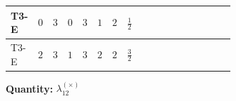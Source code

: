 \documentclass[8pt]{article}
\begin{document}
\begin{landscape}
\begin{longtable}{@{}llcccccc >{\raggedright\arraybackslash}p{0.21\linewidth} >{\raggedright\arraybackslash}p{0.21\linewidth} >{\raggedright\arraybackslash}p{0.21\linewidth}@{}}
\midrule
T3-E & $0$ & $3$ & $0$ & $3$ & $1$ & $2$ & $\frac{1}{2}$ & \scriptsize\adjustbox{max width=\linewidth}{$\begin{gathered} {\lambda_{12}^{(1)}} \left(\frac{1}{2} T_{\nu}^{(1)}+\frac{1}{2} T_{\nu}^{(2)}+8 {\lambda_{12}^{(\times)}}+{\lambda_{S_1}^{(A)}}+{\lambda_{S_2}^{(A)}}\right)\end{gathered}$} & \scriptsize\adjustbox{max width=\linewidth}{$\begin{gathered} +{\lambda_{12}^{(\times)}} (2 T_{\nu}^{(1)}+2 T_{\nu}^{(2)})\end{gathered}$} & \scriptsize\adjustbox{max width=\linewidth}{$\begin{gathered} -\frac{7}{6} \operatorname{Tr}\!\left({y_1}\,\left({y_1}\right)^{\dagger}\,{y_2}\,\left({y_2}\right)^{\dagger}\right)\end{gathered}$} \\
\midrule
T3-E & $2$ & $3$ & $1$ & $3$ & $2$ & $2$ & $\frac{3}{2}$ & \scriptsize\adjustbox{max width=\linewidth}{$\begin{gathered} {\lambda_{12}^{(1)}} \left(\frac{1}{2} T_{\nu}^{(1)}+\frac{1}{2} T_{\nu}^{(2)}+8 {\lambda_{12}^{(\times)}}+{\lambda_{S_1}^{(A)}}+{\lambda_{S_2}^{(A)}}\right)\end{gathered}$} & \scriptsize\adjustbox{max width=\linewidth}{$\begin{gathered} +{\lambda_{12}^{(\times)}} (2 T_{\nu}^{(1)}+2 T_{\nu}^{(2)})\end{gathered}$} & \scriptsize\adjustbox{max width=\linewidth}{$\begin{gathered} -\frac{7}{6} \operatorname{Tr}\!\left({y_1}\,\left({y_1}\right)^{\dagger}\,{y_2}\,\left({y_2}\right)^{\dagger}\right)\end{gathered}$} \\
\midrule
\bottomrule
\end{longtable}
\clearpage
\noindent\textbf{Quantity: }$\lambda_{12}^{(\times)}$\par\smallskip

\end{landscape}
\end{document}
